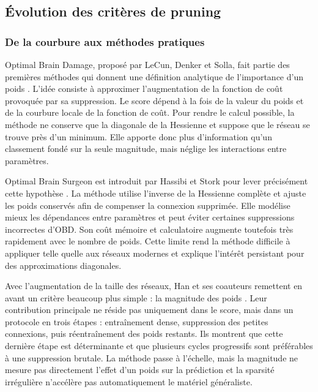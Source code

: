 \subsection{Évolution des critères de pruning}
\label{ssec:etat_art_pruning}

\subsubsection{De la courbure aux méthodes pratiques}

Optimal Brain Damage, proposé par LeCun, Denker et Solla, fait partie des
premières méthodes qui donnent une définition analytique de l'importance d'un
poids \cite{lecun1989obd}. L'idée consiste à approximer l'augmentation de la
fonction de coût provoquée par sa suppression. Le score dépend à la fois de la
valeur du poids et de la courbure locale de la fonction de coût. Pour rendre le
calcul possible, la méthode ne conserve que la diagonale de la Hessienne et
suppose que le réseau se trouve près d'un minimum. Elle apporte donc plus
d'information qu'un classement fondé sur la seule magnitude, mais néglige les
interactions entre paramètres.

Optimal Brain Surgeon est introduit par Hassibi et Stork pour lever précisément
cette hypothèse \cite{hassibi1993obs}. La méthode utilise l'inverse de la
Hessienne complète et ajuste les poids conservés afin de compenser la connexion
supprimée. Elle modélise mieux les dépendances entre paramètres et peut éviter
certaines suppressions incorrectes d'OBD. Son coût mémoire et calculatoire
augmente toutefois très rapidement avec le nombre de poids. Cette limite rend
la méthode difficile à appliquer telle quelle aux réseaux modernes et explique
l'intérêt persistant pour des approximations diagonales.

Avec l'augmentation de la taille des réseaux, Han et ses coauteurs remettent en
avant un critère beaucoup plus simple : la magnitude des poids
\cite{han2015learning}. Leur contribution principale ne réside pas uniquement
dans le score, mais dans un protocole en trois étapes : entraînement dense,
suppression des petites connexions, puis réentraînement des poids restants. Ils
montrent que cette dernière étape est déterminante et que plusieurs cycles
progressifs sont préférables à une suppression brutale. La méthode passe à
l'échelle, mais la magnitude ne mesure pas directement l'effet d'un poids sur
la prédiction et la sparsité irrégulière n'accélère pas automatiquement le
matériel généraliste.

